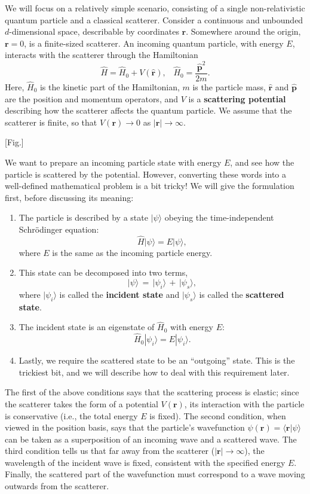 \documentclass[pra,11pt]{revtex4}
\begin{document}
We will focus on a relatively simple scenario, consisting of a single
non-relativistic quantum particle and a classical scatterer.  Consider
a continuous and unbounded $d$-dimensional space, describable by
coordinates $\mathbf{r}$.  Somewhere around the origin, $\mathbf{r} =
0$, is a finite-sized scatterer.  An incoming quantum particle, with
energy $E$, interacts with the scatterer through the Hamiltonian
$$\hat{H} = \hat{H}_0 + V(\hat{\mathbf{r}}), \;\;\; \hat{H}_0 = \frac{\hat{\mathbf{p}}^2}{2m}.$$
Here, $\hat{H}_0$ is the kinetic part of the Hamiltonian, $m$ is the
particle mass, $\hat{\mathbf{r}}$ and $\hat{\mathbf{p}}$ are the
position and momentum operators, and $V$ is a \textbf{scattering
  potential} describing how the scatterer affects the quantum
particle.  We assume that the scatterer is finite, so that
$V(\mathbf{r}) \rightarrow 0$ as $|\mathbf{r}| \rightarrow \infty$.

[Fig.]

We want to prepare an incoming particle state with energy $E$, and see
how the particle is scattered by the potential.  However, converting
these words into a well-defined mathematical problem is a bit tricky!
We will give the formulation first, before discussing its meaning:
\begin{enumerate}
\item 
The particle is described by a state $|\psi\rangle$ obeying the
time-independent Schr\"odinger equation:
$$\hat{H} |\psi\rangle = E |\psi\rangle,$$
where $E$ is the same as the incoming particle energy.  

\item
This state can be decomposed into two terms,
$$|\psi\rangle \,=\, |\psi_i\rangle \,+\, |\psi_s\rangle,$$
where $|\psi_i\rangle$ is called the \textbf{incident state} and
$|\psi_s\rangle$ is called the \textbf{scattered state}.  

\item
The incident state is an eigenstate of $\hat{H}_0$ with energy $E$:
$$\hat{H}_0 |\psi_i\rangle = E |\psi_i\rangle.$$

\item
Lastly, we require the scattered state to be an ``outgoing'' state.
This is the trickiest bit, and we will describe how to deal with this
requirement later.
\end{enumerate}
The first of the above conditions says that the scattering process is
elastic; since the scatterer takes the form of a potential
$V(\mathbf{r})$, its interaction with the particle is conservative
(i.e., the total energy $E$ is fixed).  The second condition, when
viewed in the position basis, says that the particle's wavefunction
$\psi(\mathbf{r}) = \langle \mathbf{r} |\psi\rangle$ can be taken as a
superposition of an incoming wave and a scattered wave.  The third
condition tells us that far away from the scatterer
($|\mathbf{r}|\rightarrow \infty$), the wavelength of the incident
wave is fixed, consistent with the specified energy $E$.  Finally, the
scattered part of the wavefunction must correspond to a wave moving
outwards from the scatterer.
\end{document}
